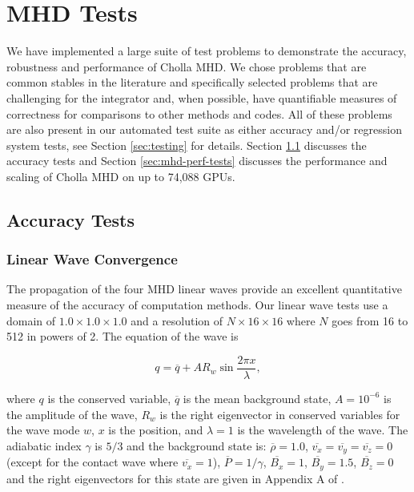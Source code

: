 \section{MHD Tests}
\label{sec:mhd-tests}

We have implemented a large suite of test problems to demonstrate the accuracy, robustness and performance of Cholla MHD. We chose problems that are common stables in the literature and specifically selected problems that are challenging for the integrator and, when possible, have quantifiable measures of correctness for comparisons to other methods and codes. All of these problems are also present in our automated test suite as either accuracy and/or regression system tests, see Section \ref{sec:testing} for details. Section \ref{sec:accuracy_tests} discusses the accuracy tests and Section \ref{sec:mhd-perf-tests} discusses the performance and scaling of Cholla MHD on up to 74,088 GPUs.

\subsection{Accuracy Tests}
\label{sec:accuracy_tests}

\subsubsection{Linear Wave Convergence}
\label{sec:lwc}

The propagation of the four MHD linear waves provide an excellent quantitative measure of the accuracy of computation methods. Our linear wave tests use a domain of $1.0\times1.0\times1.0$ and a resolution of $N\times16\times16$ where $N$ goes from 16 to 512 in powers of 2. The equation of the wave is

\begin{equation}
    q = \overline{q} + A R_w \sin{\frac{2\pi x}{\lambda}},
\end{equation}

\noindent where $q$ is the conserved variable, $\overline{q}$ is the mean background state, $A=10^{-6}$ is the amplitude of the wave, $R_w$ is the right eigenvector in conserved variables for the wave mode $w$, $x$ is the position, and $\lambda=1$ is the wavelength of the wave. The adiabatic index $\gamma$ is $5/3$ and the background state is: 
$\overline{\rho}=1.0$,
$\overline{v_x}=\overline{v_y}=\overline{v_z}=0$ (except for the contact wave where $\overline{v_x} = 1$),
$\overline{P}=1/\gamma$,
$\overline{B_x}=1$,
$\overline{B_y}=1.5$,
$\overline{B_z}=0$ 
and the right eigenvectors for this state are given in Appendix A of \cite{gardiner_unsplit_2008}. 

